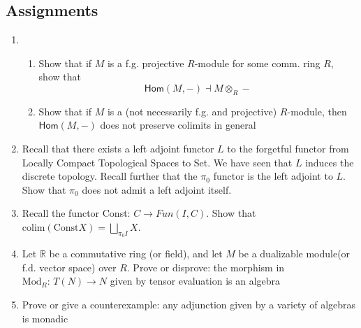 \documentclass{article}
\begin{document}
\subsection{Assignments}
\begin{enumerate}
	\item \begin{enumerate}
		\item Show that if $M$ is a f.g. projective $R$-module for some comm. ring $R$, show that $$\textsf{Hom}(M,-)\dashv M\otimes_R -$$
		\item Show that if $M$ is a (not necessarily f.g. and projective) $R$-module, then $\textsf{Hom}(M,-)$ does not preserve colimits in general
	\end{enumerate}
	\item Recall that there exists a left adjoint functor $L$ to the forgetful functor from Locally Compact Topological Spaces to Set. We have seen that $L$ induces the discrete topology. Recall further that the $\pi_0$ functor is the left adjoint to $L$. Show that $\pi_0$ does not admit a left adjoint itself.
	\item Recall the functor Const: $C\to Fun(I,C)$. Show that $\text{colim}(\text{Const} X) = \bigsqcup_{\pi_0 I}X$.
	\item Let $\mathbb{R}$ be a commutative ring (or field), and let $M$ be a dualizable module(or f.d. vector space) over $R$.  Prove or disprove: the morphism in $\text{Mod}_R:\,T(N)\to N$ given by tensor evaluation is an algebra
	\item Prove or give a counterexample: any adjunction given by a variety of algebras is monadic
\end{enumerate}


\end{document}
